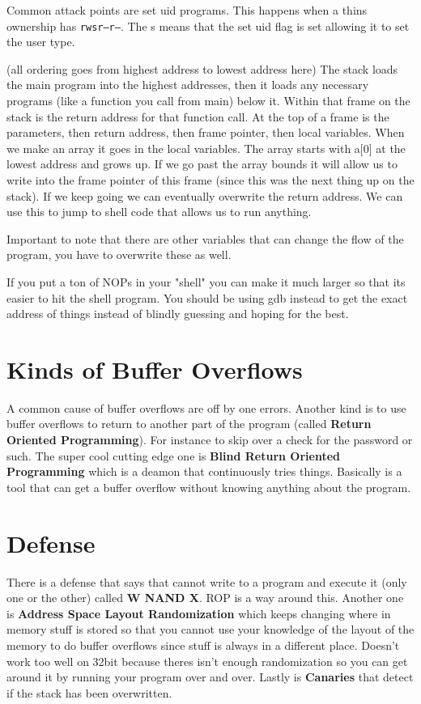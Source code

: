 \documentclass{article}
\begin{document}
Common attack points are set uid programs. This happens when a thins ownership has \texttt{rwsr--r--}. The s means that the set uid flag is set allowing it to set the user type.

(all ordering goes from highest address to lowest address here) The stack loads the main program into the highest addresses, then it loads any necessary programs (like a function you call from main) below it. Within that frame on the stack is the return address for that function call. At the top of a frame is the parameters, then return address, then frame pointer, then local variables. When we make an array it goes in the local variables. The array starts with a[0] at the lowest address and grows up. If we go past the array bounds it will allow us to write into the frame pointer of this frame (since this was the next thing up on the stack). If we keep going we can eventually overwrite the return address. We can use this to jump to shell code that allows us to run anything. 

Important to note that there are other variables that can change the flow of the program, you have to overwrite these as well.

If you put a ton of NOPs in your "shell" you can make it much larger so that its easier to hit the shell program. You should be using gdb instead to get the exact address of things instead of blindly guessing and hoping for the best.


\section{Kinds of Buffer Overflows} %
\label{sec:kinds_of_buffer_overflows}
A common cause of buffer overflows are off by one errors. Another kind is to use buffer overflows to return to another part of the program (called \textbf{Return Oriented Programming}). For instance to skip over a check for the password or such. The super cool cutting edge one is \textbf{Blind Return Oriented Programming} which is a deamon that continuously tries things. Basically is a tool that can get a buffer overflow without knowing anything about the program.


\section{Defense} %
\label{sec:defense}
There is a defense that says that cannot write to a program and execute it (only one or the other) called \textbf{W NAND X}. ROP is a way around this. Another one is \textbf{Address Space Layout Randomization} which keeps changing where in memory stuff is stored so that you cannot use your knowledge of the layout of the memory to do buffer overflows since stuff is always in a different place. Doesn't work too well on 32bit because theres isn't enough randomization so you can get around it by running your program over and over. Lastly is \textbf{Canaries} that detect if the stack has been overwritten.

\end{document}
